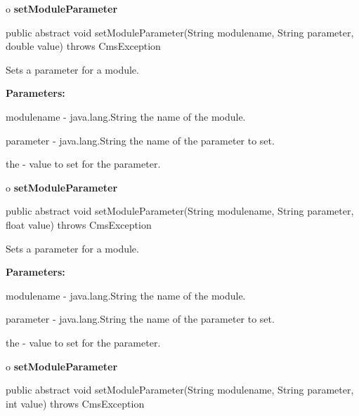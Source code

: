 o {\bf setModuleParameter} 

\begin{PRE}
 public abstract void setModuleParameter(String modulename,
                                         String parameter,
                                         double value) throws CmsException
\end{PRE}

\begin{description}
\htmlDD Sets a parameter for a module. 

\begin{description}
\item {\bf Parameters:}  

modulename - java.lang.String the name of the module.  

parameter - java.lang.String the name of the parameter to set.  

the - value to set for the parameter.  
\end{description}

\end{description}

o {\bf setModuleParameter} 

\begin{PRE}
 public abstract void setModuleParameter(String modulename,
                                         String parameter,
                                         float value) throws CmsException
\end{PRE}

\begin{description}
\htmlDD Sets a parameter for a module. 

\begin{description}
\item {\bf Parameters:}  

modulename - java.lang.String the name of the module.  

parameter - java.lang.String the name of the parameter to set.  

the - value to set for the parameter.  
\end{description}

\end{description}

o {\bf setModuleParameter} 

\begin{PRE}
 public abstract void setModuleParameter(String modulename,
                                         String parameter,
                                         int value) throws CmsException
\end{PRE}

